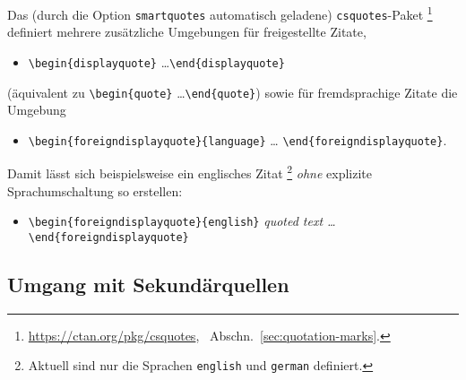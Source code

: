 Das (durch die Option \texttt{smartquotes} automatisch geladene)
\texttt{csquotes}-Paket%
\footnote{\url{https://ctan.org/pkg/csquotes}, \sa\ Abschn.\
\ref{sec:quotation-marks}.}
definiert mehrere zusätzliche Umgebungen für freigestellte Zitate, \zB\
%
\begin{itemize}
    \item[] \verb!\begin{displayquote}! \ldots \verb!\end{displayquote}!
\end{itemize}
%
(äquivalent zu \verb!\begin{quote}! \ldots \verb!\end{quote}!) sowie für
fremdsprachige Zitate die Umgebung
%
\begin{itemize}
    \item[] \verb!\begin{foreigndisplayquote}{language}! \ldots
    \verb!\end{foreigndisplayquote}!.
\end{itemize}
%
Damit lässt sich beispielsweise ein englisches Zitat%
\footnote{Aktuell sind nur die Sprachen \texttt{english} und \texttt{german}
definiert.}
\emph{ohne} explizite Sprachumschaltung so erstellen:
%
\begin{itemize}
    \item[] \verb!\begin{foreigndisplayquote}{english}!\newline
    \emph{quoted text \ldots}\newline
    \verb!\end{foreigndisplayquote}!
\end{itemize}


\subsection{Umgang mit Sekundärquellen}


